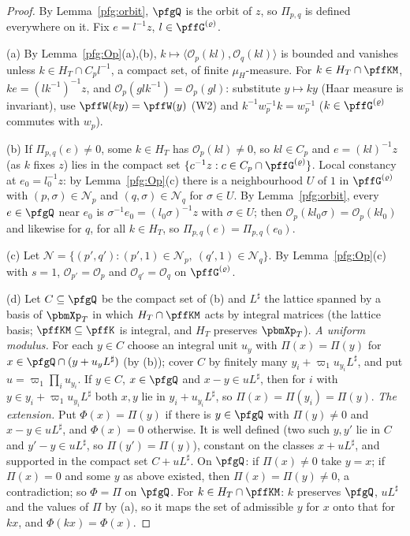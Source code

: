 \documentclass[10pt]{amsart}
\theoremstyle{definition}
\theoremstyle{remark}
\begin{document}
\begin{proof}
By Lemma~\ref{pfg:orbit}, $\pfgQ$ is the orbit of $z$, so $\Pi_{p,q}$ is defined everywhere on it. Fix $e=l^{-1}z$,
$l\in\pffG^{(\varrho)}$.

(a) By Lemma~\ref{pfg:Op}(a),(b), $k\mapsto\langle\mathcal O_p(kl),\mathcal O_q(kl)\rangle$ is bounded and vanishes unless
$k\in H_T\cap C_pl^{-1}$, a compact set, of finite $\mu_H$-measure. For $k\in H_T\cap\pffKM$, $ke=(lk^{-1})^{-1}z$, and
$\mathcal O_p(glk^{-1})=\mathcal O_p(gl)$: substitute $y\mapsto ky$ (Haar measure is invariant), use $\pffW(ky)=\pffW(y)$ (W2) and
$k^{-1}w_p^{-1}k=w_p^{-1}$ ($k\in\pffG^{(\varrho)}$ commutes with $w_p$).

(b) If $\Pi_{p,q}(e)\ne0$, some $k\in H_T$ has $\mathcal O_p(kl)\ne0$, so $kl\in C_p$ and $e=(kl)^{-1}z$ (as $k$ fixes $z$) lies in
the compact set $\{c^{-1}z:c\in C_p\cap\pffG^{(\varrho)}\}$. Local constancy at $e_0=l_0^{-1}z$: by Lemma~\ref{pfg:Op}(c) there
is a neighbourhood $U$ of $1$ in $\pffG^{(\varrho)}$ with $(p,\sigma)\in\mathcal N_p$ and $(q,\sigma)\in\mathcal N_q$ for $\sigma\in U$. By
Lemma~\ref{pfg:orbit}, every $e\in\pfgQ$ near $e_0$ is $\sigma^{-1}e_0=(l_0\sigma)^{-1}z$ with $\sigma\in U$; then
$\mathcal O_p(kl_0\sigma)=\mathcal O_p(kl_0)$ and likewise for $q$, for all $k\in H_T$, so $\Pi_{p,q}(e)=\Pi_{p,q}(e_0)$.

(c) Let $\mathcal N=\{(p',q'):(p',1)\in\mathcal N_p,\ (q',1)\in\mathcal N_q\}$. By Lemma~\ref{pfg:Op}(c) with $s=1$,
$\mathcal O_{p'}=\mathcal O_p$ and $\mathcal O_{q'}=\mathcal O_q$ on $\pffG^{(\varrho)}$.

(d) Let $C\subseteq\pfgQ$ be the compact set of (b) and $L^\sharp$ the lattice spanned by a basis of $\pbmXp_T$ in which
$H_T\cap\pffKM$ acts by integral matrices (the lattice basis; $\pffKM\subseteq\pffK$ is integral, and $H_T$ preserves $\pbmXp_T$).
\emph{A uniform modulus.} For each $y\in C$ choose an integral unit $u_y$ with $\Pi(x)=\Pi(y)$ for $x\in\pfgQ\cap(y+u_yL^\sharp)$
(by (b)); cover $C$ by finitely many $y_i+\varpi_1u_{y_i}L^\sharp$, and put $u=\varpi_1\prod_iu_{y_i}$. If $y\in C$, $x\in\pfgQ$ and
$x-y\in uL^\sharp$, then for $i$ with $y\in y_i+\varpi_1u_{y_i}L^\sharp$ both $x,y$ lie in $y_i+u_{y_i}L^\sharp$, so
$\Pi(x)=\Pi(y_i)=\Pi(y)$. \emph{The extension.} Put $\Phi(x)=\Pi(y)$ if there is $y\in\pfgQ$ with $\Pi(y)\ne0$ and
$x-y\in uL^\sharp$, and $\Phi(x)=0$ otherwise. It is well defined (two such $y,y'$ lie in $C$ and $y'-y\in uL^\sharp$, so
$\Pi(y')=\Pi(y)$), constant on the classes $x+uL^\sharp$, and supported in the compact set $C+uL^\sharp$. On $\pfgQ$:
if $\Pi(x)\ne0$ take $y=x$; if $\Pi(x)=0$ and some $y$ as above existed, then $\Pi(x)=\Pi(y)\ne0$, a contradiction; so
$\Phi=\Pi$ on $\pfgQ$. For $k\in H_T\cap\pffKM$: $k$ preserves $\pfgQ$, $uL^\sharp$ and the values of $\Pi$ by (a), so it maps the
set of admissible $y$ for $x$ onto that for $kx$, and $\Phi(kx)=\Phi(x)$.
\end{proof}
\end{document}
